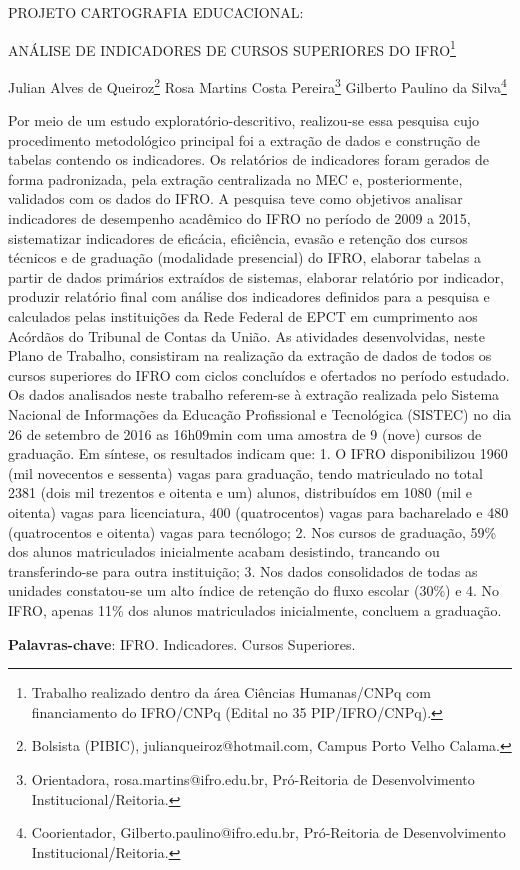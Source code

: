 \documentclass[article,12pt,onesidea,4paper,english,brazil]{abntex2}
\begin{document}
	
	
	\frenchspacing 
	
	\begin{center}
		\LARGE PROJETO CARTOGRAFIA EDUCACIONAL:
		
		ANÁLISE DE INDICADORES DE CURSOS SUPERIORES DO IFRO\footnote{Trabalho realizado dentro da área Ciências Humanas/CNPq com financiamento do IFRO/CNPq
			(Edital no 35 PIP/IFRO/CNPq).}
		
		\normalsize
		Julian Alves de Queiroz\footnote{Bolsista (PIBIC), julianqueiroz@hotmail.com, Campus Porto Velho Calama.} 
		Rosa Martins Costa Pereira\footnote{Orientadora, rosa.martins@ifro.edu.br, Pró-Reitoria de Desenvolvimento Institucional/Reitoria.} 
		Gilberto Paulino da Silva\footnote{Coorientador, Gilberto.paulino@ifro.edu.br, Pró-Reitoria de Desenvolvimento Institucional/Reitoria.} 
		 
	\end{center}
	
	\noindent Por meio de um estudo exploratório-descritivo, realizou-se essa pesquisa cujo
	procedimento metodológico principal foi a extração de dados e construção de
	tabelas contendo os indicadores. Os relatórios de indicadores foram gerados de
	forma padronizada, pela extração centralizada no MEC e, posteriormente, validados
	com os dados do IFRO. A pesquisa teve como objetivos analisar indicadores de
	desempenho acadêmico do IFRO no período de 2009 a 2015, sistematizar
	indicadores de eficácia, eficiência, evasão e retenção dos cursos técnicos e de
	graduação (modalidade presencial) do IFRO, elaborar tabelas a partir de dados
	primários extraídos de sistemas, elaborar relatório por indicador, produzir relatório
	final com análise dos indicadores definidos para a pesquisa e calculados pelas
	instituições da Rede Federal de EPCT em cumprimento aos Acórdãos do Tribunal
	de Contas da União. As atividades desenvolvidas, neste Plano de Trabalho,
	consistiram na realização da extração de dados de todos os cursos superiores do
	IFRO com ciclos concluídos e ofertados no período estudado. Os dados analisados
	neste trabalho referem-se à extração realizada pelo Sistema Nacional de
	Informações da Educação Profissional e Tecnológica (SISTEC) no dia 26 de
	setembro de 2016 as 16h09min com uma amostra de 9 (nove) cursos de graduação.
	Em síntese, os resultados indicam que: 1. O IFRO disponibilizou 1960 (mil
	novecentos e sessenta) vagas para graduação, tendo matriculado no total 2381
	(dois mil trezentos e oitenta e um) alunos, distribuídos em 1080 (mil e oitenta) vagas
	para licenciatura, 400 (quatrocentos) vagas para bacharelado e 480 (quatrocentos e
	oitenta) vagas para tecnólogo; 2. Nos cursos de graduação, 59\% dos alunos
	matriculados inicialmente acabam desistindo, trancando ou transferindo-se para
	outra instituição; 3. Nos dados consolidados de todas as unidades constatou-se um
	alto índice de retenção do fluxo escolar (30\%) e 4. No IFRO, apenas 11\% dos alunos
	matriculados inicialmente, concluem a graduação.
	
	\vspace{\onelineskip}
	
	\noindent
	\textbf{Palavras-chave}: IFRO. Indicadores. Cursos Superiores.
	
\end{document}
